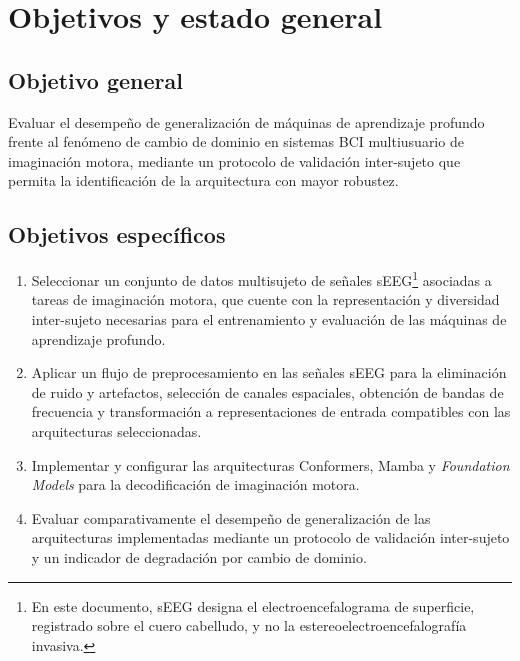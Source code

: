 \chapter{Objetivos y estado general}

\section*{Objetivo general}

Evaluar el desempeño de generalización de máquinas de aprendizaje profundo
frente al fenómeno de cambio de dominio en sistemas BCI multiusuario de
imaginación motora, mediante un protocolo de validación inter-sujeto que
permita la identificación de la arquitectura con mayor robustez.

\section*{Objetivos específicos}

\begin{enumerate}
  \item Seleccionar un conjunto de datos multisujeto de señales sEEG\footnote{En este
        documento, sEEG designa el electroencefalograma de superficie, registrado sobre el
        cuero cabelludo, y no la estereoelectroencefalografía invasiva.} asociadas
        a tareas de imaginación motora, que cuente con la representación y
        diversidad inter-sujeto necesarias para el entrenamiento y evaluación
        de las máquinas de aprendizaje profundo.
        \label{oe:1}

  \item Aplicar un flujo de preprocesamiento en las señales sEEG para la
        eliminación de ruido y artefactos, selección de canales espaciales,
        obtención de bandas de frecuencia y transformación a representaciones
        de entrada compatibles con las arquitecturas seleccionadas.
        \label{oe:2}

  \item Implementar y configurar las arquitecturas Conformers, Mamba y
        \textit{Foundation Models} para la decodificación de imaginación
        motora.
        \label{oe:3}

  \item Evaluar comparativamente el desempeño de generalización de las
        arquitecturas implementadas mediante un protocolo de validación
        inter-sujeto y un indicador de degradación por cambio de dominio.
        \label{oe:4}
\end{enumerate}

